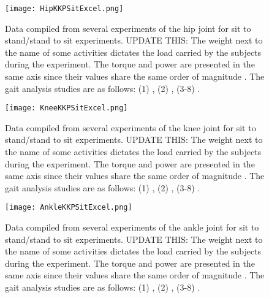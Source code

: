 \begin{figure}[htbp]
    \centering
    \texttt{[image: HipKKPSitExcel.png]}
    \caption{Data compiled from several experiments of the hip joint for sit to stand/stand to sit experiments. UPDATE THIS: The weight next to the name of some activities dictates the load carried by the subjects during the experiment. The torque and power are presented in the same axis since their values share the  same order of magnitude \cite{solis2017characterization}. The gait analysis studies are as follows: (1) \cite{bovi2011multiple}, (2) \cite{lee2008biomechanics}, (3-8) \cite{han2011biomechanical}.  }
    \label{fig:hipKKPSit}
\end{figure}

\begin{figure}[htbp]
    \centering
    \texttt{[image: KneeKKPSitExcel.png]}
    \caption{Data compiled from several experiments of the knee joint for sit to stand/stand to sit experiments. UPDATE THIS: The weight next to the name of some activities dictates the load carried by the subjects during the experiment. The torque and power are presented in the same axis since their values share the  same order of magnitude \cite{solis2017characterization}. The gait analysis studies are as follows: (1) \cite{bovi2011multiple}, (2) \cite{lee2008biomechanics}, (3-8) \cite{han2011biomechanical}. }
    \label{fig:kneeKKPSit}
\end{figure}

\begin{figure}[htbp]
    \centering
    \texttt{[image: AnkleKKPSitExcel.png]}
    \caption{Data compiled from several experiments of the ankle joint for sit to stand/stand to sit experiments. UPDATE THIS: The weight next to the name of some activities dictates the load carried by the subjects during the experiment. The torque and power are presented in the same axis since their values share the  same order of magnitude \cite{solis2017characterization}. The gait analysis studies are as follows: (1) \cite{bovi2011multiple}, (2) \cite{lee2008biomechanics}, (3-8) \cite{han2011biomechanical}. }
    \label{fig:ankleKKPSit}
\end{figure}

